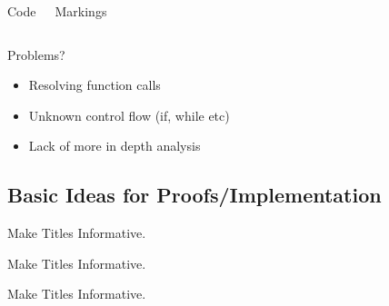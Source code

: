\begin{frame}
\begin{columns}[t]
{\begin{block}{Code}
\end{block}
\begin{block}{Markings}
\begin{itemize}
\end{itemize}
\end{block}}
\end{columns}
\end{frame}

\begin{frame}{Problems?}
\begin{itemize}
\item Resolving function calls
\item Unknown control flow (if, while etc)
\item Lack of more in depth analysis
\end{itemize}
\end{frame}


\subsection{Basic Ideas for Proofs/Implementation}

\begin{frame}{Make Titles Informative.}
\end{frame}

\begin{frame}{Make Titles Informative.}
\end{frame}

\begin{frame}{Make Titles Informative.}
\end{frame}




